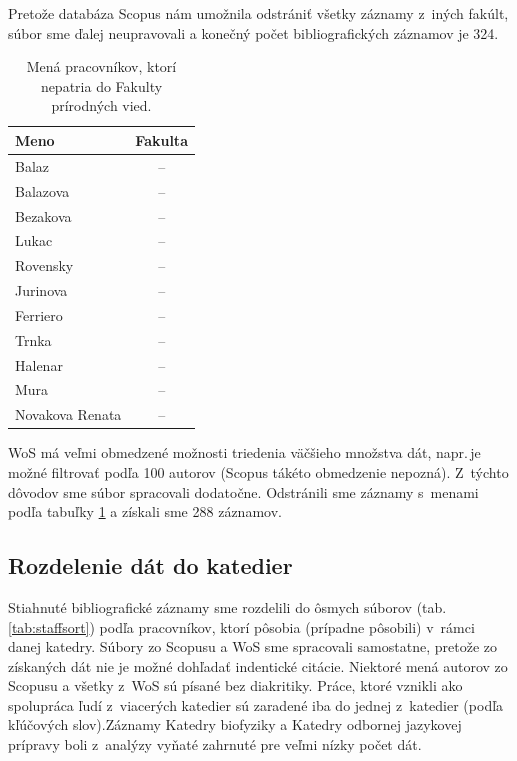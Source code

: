 Pretože databáza Scopus nám umožnila odstrániť všetky záznamy z~iných fakúlt,
súbor  sme ďalej neupravovali a konečný počet
bibliografických záznamov je 324.

\begin{table}
\centering\small
\begin{tabular}{lc}
  \hline\noalign{\vspace{.3ex}}
  Meno            & Fakulta \\[0.3ex]
  \hline\noalign{\vspace{.5ex}}
  Balaz           & -- \\
  Balazova        & -- \\
  Bezakova        & -- \\
  Lukac           & -- \\
  Rovensky        & -- \\[1ex]
  Jurinova        & -- \\
  Ferriero        & -- \\
  Trnka           & -- \\
  Halenar         & -- \\
  Mura            & -- \\[1ex]
  Novakova Renata & -- \\[0.5ex]
  \hline
\end{tabular}
\caption{Mená pracovníkov, ktorí nepatria do Fakulty prírodných vied.}
\label{tab:wos.excludedstaff}
\end{table}

WoS má veľmi obmedzené možnosti triedenia väčšieho množstva dát, napr.\,je možné
filtrovať podľa 100 autorov (Scopus tákéto obmedzenie nepozná).  Z~týchto
dôvodov sme súbor  spracovali dodatočne.
Odstránili sme záznamy s~menami podľa tabuľky \ref{tab:wos.excludedstaff} a
získali sme 288 záznamov.


\subsection{Rozdelenie dát do katedier}

Stiahnuté bibliografické záznamy sme rozdelili do ôsmych súborov
(tab.\,\ref{tab:staffsort}) podľa pracovníkov, ktorí pôsobia (prípadne pôsobili)
v~rámci danej katedry.  Súbory zo Scopusu a WoS sme spracovali samostatne,
pretože zo získaných dát nie je možné dohľadať indentické citácie.  Niektoré
mená autorov zo Scopusu a všetky z~WoS sú písané bez diakritiky.  Práce, ktoré
vznikli ako spolupráca ľudí z~viacerých katedier sú zaradené iba do jednej
z~katedier (podľa kľúčových slov).Záznamy Katedry biofyziky a Katedry odbornej
jazykovej prípravy boli z~analýzy vyňaté zahrnuté pre veľmi nízky počet dát.

